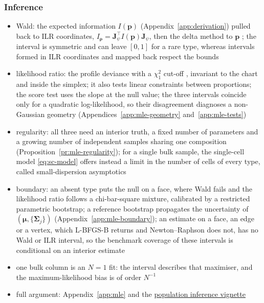 \documentclass[pdflatex, sn-nature]{sn-jnl}
\theoremstyle{thmstyleone}%
\theoremstyle{thmstyletwo}%
\theoremstyle{thmstylethree}%
\newcommand{\vignette}[2]{\href{https://bastienchassagnol.github.io/DeCovarT/articles/#1}{#2}}
\begin{document}
\subsubsection{Inference}
\label{sec:inference}
\label{sec:intervals}

\begin{itemize}
  \item Wald: the expected information \(I(\boldsymbol{p})\) (Appendix~\ref{app:derivation}) pulled back to ILR coordinates,
        \(I_{\boldsymbol{\rho}}=\mathbf{J}_{\psi}^{\top}I(\boldsymbol{p})\mathbf{J}_{\psi}\), then the delta method to \(\boldsymbol{p}\)
        \cite{oehlertNoteDeltaMethod1992}; the interval is symmetric and can leave \([0,1]\) for a rare type, whereas
        intervals formed in ILR coordinates and mapped back respect the bounds
  \item likelihood ratio: the profile deviance with a \(\chi^{2}_{1}\) cut-off \cite{wilksLargeSampleDistributionLikelihood1938},
        invariant to the chart and inside the simplex; it also tests linear constraints between proportions;
        the score test uses the slope at the null value; the three intervals coincide only for a quadratic
        log-likelihood, so their disagreement diagnoses a non-Gaussian geometry (Appendices~\ref{app:mle-geometry}
        and~\ref{app:mle-tests})
  \item regularity: all three need an interior truth, a fixed number of parameters and a growing number of
        independent samples sharing one composition (Proposition~\ref{pr:mle-regularity}); for a single bulk
        sample, the single-cell model \eqref{eq:sc-model} offers instead a limit in the number of cells of every
        type, called small-dispersion asymptotics \cite{jørgensenSmallDispersionAsymptotics1987}
  \item boundary: an absent type puts the null on a face, where Wald fails and the likelihood ratio follows a
        chi-bar-square mixture, calibrated by a restricted parametric bootstrap; a reference bootstrap propagates
        the uncertainty of \((\boldsymbol{\mu},\{\boldsymbol{\Sigma}_{j}\})\) (Appendix~\ref{app:mle-boundary}); an
        estimate on a face, an edge or a vertex, which L-BFGS-B returns and Newton--Raphson does not, has no Wald or
        ILR interval, so the benchmark coverage of these intervals is conditional on an interior estimate
  \item one bulk column is an \(N=1\) fit: the interval describes that maximiser, and the
        maximum-likelihood bias is of order \(N^{-1}\)
  \item full argument: Appendix~\ref{app:mle} and the
        \vignette{01-2-population-inference.html}{population inference vignette}
\end{itemize}
\end{document}
